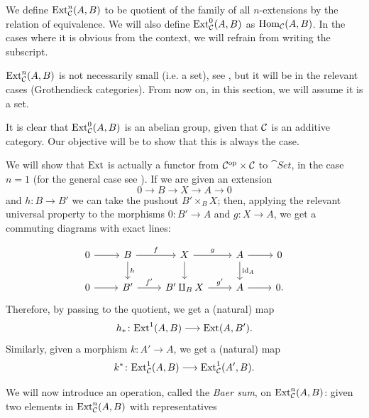 \begin{definition}[Ext]
	We define $\mathrm{Ext}^n_{\mathcal{C}}(A,B)$ to be quotient of the family of all $n$-extensions by the relation of equivalence. We will also define $\mathrm{Ext}^0_{\mathcal{C}}(A,B)$ as $\mathrm{Hom}_{\mathcal{C}}(A,B)$. In the cases where it is obvious from the context, we will refrain from writing the subscript.
\end{definition}
\begin{remark}
	$\mathrm{Ext}^n_{\mathcal{C}}(A,B)$ is not necessarily small (i.e. a set), see \cite[\href{https://stacks.math.columbia.edu/tag/07JS}{Section 07JS}]{stacks-project}, but it will be in the relevant cases (Grothendieck categories). From now on, in this section, we will assume it is a set. 
\end{remark}
\begin{remark}
	It is clear that $\mathrm{Ext}^0_{\mathcal{C}}(A,B)$ is an abelian group, given that $\mathcal{C}$ is an additive category. Our objective will be to show that this is always the case.
\end{remark}

We will show that $\mathrm{Ext}$ is actually a functor from $\mathcal{C}^{\mathrm{op}} \times \mathcal{C}$ to $\cat{Set}$, in the case $n=1$ (for the general case see \cite{maclane2012homology}). 
If we are given an extension 
\[0 \longrightarrow B \longrightarrow X \longrightarrow A \longrightarrow 0 \]
and $h\colon B\longrightarrow B'$ we can take the pushout ${B'\times_B X}$; then, applying the relevant universal property to the morphisms $0\colon B' \longrightarrow A$ and $g \colon X \longrightarrow A$, we get a commuting diagrams with exact lines:


\[\begin{tikzcd}
	0 & B & X & A & 0 \\
	0 & {B'} & {B'\amalg_B X} & A & {0.}
	\arrow[from=1-1, to=1-2]
	\arrow["f", from=1-2, to=1-3]
	\arrow["h", from=1-2, to=2-2]
	\arrow["g", from=1-3, to=1-4]
	\arrow[from=1-3, to=2-3]
	\arrow[from=1-4, to=1-5]
	\arrow["{\id_A}", from=1-4, to=2-4]
	\arrow[from=2-1, to=2-2]
	\arrow["{f'}", from=2-2, to=2-3]
	\arrow["{g'}", from=2-3, to=2-4]
	\arrow[from=2-4, to=2-5]
\end{tikzcd}\]
Therefore, by passing to the quotient, we get a (natural) map \[h_{*}\colon \mathrm{Ext}^1(A,B) \longrightarrow \mathrm{Ext}(A,B').\] 
Similarly, given a morphism $k:A'\longrightarrow A$, we get a (natural) map 
\[k^* \colon \mathrm{Ext}^1_{\mathcal{C}}(A, B) \longrightarrow \mathrm{Ext}^1_{\mathcal{C}}(A',B).\] 

We will now introduce an operation, called the \textit{Baer sum}, on $\mathrm{Ext}^n_{\mathcal{C}}(A,B)$: given two elements in $\mathrm{Ext}^n_{\mathcal{C}}(A,B)$ with representatives

